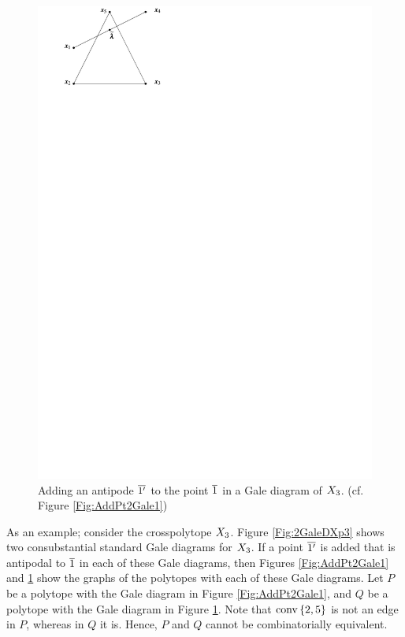         \begin{figure}[p!hbt]
            \centering
                \includegraphics[width=.8\textwidth, page=18]{pictures.pdf}
            \caption{Adding an antipode $\overline{1'}$ to the point $\overline{1}$ in a Gale diagram of $X_{3}$. (cf.{} Figure \ref{Fig:AddPt2Gale1})\label{Fig:AddPt2Gale2}}
        \end{figure}

        As an example; consider the crosspolytope \(X_{3}\).  Figure \ref{Fig:2GaleDXp3} shows two consubstantial standard Gale diagrams for \(X_{3}\).  If a point \(\overline{1'}\) is added that is antipodal to \(\overline{1}\) in each of these Gale diagrams, then Figures \ref{Fig:AddPt2Gale1} and \ref{Fig:AddPt2Gale2} show the graphs of the polytopes with each of these Gale diagrams.  Let \(P\) be a polytope with the Gale diagram in Figure \ref{Fig:AddPt2Gale1}, and \(Q\) be a polytope with the Gale diagram in Figure \ref{Fig:AddPt2Gale2}.  Note that \(\operatorname{conv}\left\{2,5\right\}\) is not an edge in \(P\), whereas in \(Q\) it is.  Hence, \(P\) and \(Q\) cannot be combinatorially equivalent.

